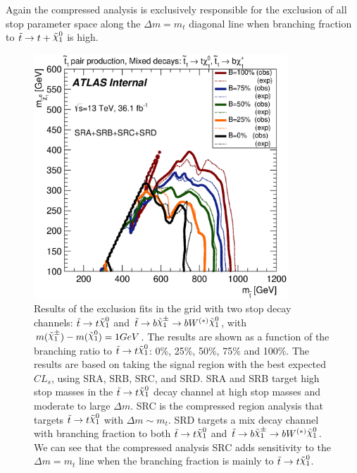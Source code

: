 \indent Again the compressed analysis is exclusively responsible for the exclusion of all stop parameter space along the $\Delta m = m_{t}$ diagonal line when branching fraction to $\stop \rightarrow t+\ninoone$ is high. \\

\begin{figure}[htbp]
	\begin{center}
		\includegraphics[width=0.85\textwidth]{figures/fit//SRABCD_mixed_dm1.eps}
		\caption{Results of the exclusion fits in the grid
                  with two stop decay channels: $\stop\ra t\ninoone$
                  and $\stop\ra b\chinoonepm\ra b
                  W^{(*)}\ninoone$, with $m(\chinoonepm)-m(\ninoone) =
                  1 GeV$.  The results are shown as a function of the
                  branching ratio to $\stop\ra t\ninoone$: 0\%, 25\%, 50\%, 75\% and 100\%.  
                  The results are based on taking the signal region with the best
                  expected $CL_s$, using SRA, SRB, SRC, and SRD.
                  SRA and SRB target high stop masses in the  $\stop\ra t\ninoone$ decay channel at high stop masses and moderate to large $\Delta m$.  SRC is the compressed region analysis that targets  $\stop\ra t\ninoone$ with $\Delta m \sim m_t$.  SRD targets a mix decay channel with branching fraction to both  $\stop\ra t\ninoone$ and $\stop\ra b\chinoonepm\ra b W^{(*)}\ninoone$.  We can see that the compressed analysis SRC adds sensitivity to the $\Delta m = m_t$ line when the branching fraction is mainly to $\stop\ra t\ninoone$.}
		\label{figure.exclusion.SRABCD_dm1}
	\end{center}
\end{figure}